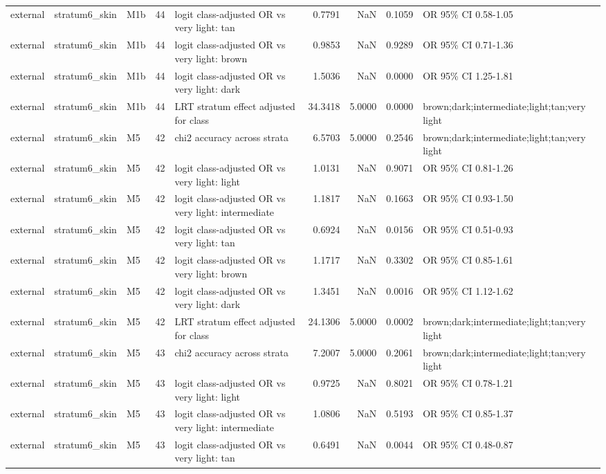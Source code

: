\begin{tabular}{lllrlrrrl}
external & stratum6\_skin & M1b & 44 & logit class-adjusted OR vs very light: tan & 0.7791 & NaN & 0.1059 & OR 95\% CI 0.58-1.05 \\
external & stratum6\_skin & M1b & 44 & logit class-adjusted OR vs very light: brown & 0.9853 & NaN & 0.9289 & OR 95\% CI 0.71-1.36 \\
external & stratum6\_skin & M1b & 44 & logit class-adjusted OR vs very light: dark & 1.5036 & NaN & 0.0000 & OR 95\% CI 1.25-1.81 \\
external & stratum6\_skin & M1b & 44 & LRT stratum effect adjusted for class & 34.3418 & 5.0000 & 0.0000 & brown;dark;intermediate;light;tan;very light \\
external & stratum6\_skin & M5 & 42 & chi2 accuracy across strata & 6.5703 & 5.0000 & 0.2546 & brown;dark;intermediate;light;tan;very light \\
external & stratum6\_skin & M5 & 42 & logit class-adjusted OR vs very light: light & 1.0131 & NaN & 0.9071 & OR 95\% CI 0.81-1.26 \\
external & stratum6\_skin & M5 & 42 & logit class-adjusted OR vs very light: intermediate & 1.1817 & NaN & 0.1663 & OR 95\% CI 0.93-1.50 \\
external & stratum6\_skin & M5 & 42 & logit class-adjusted OR vs very light: tan & 0.6924 & NaN & 0.0156 & OR 95\% CI 0.51-0.93 \\
external & stratum6\_skin & M5 & 42 & logit class-adjusted OR vs very light: brown & 1.1717 & NaN & 0.3302 & OR 95\% CI 0.85-1.61 \\
external & stratum6\_skin & M5 & 42 & logit class-adjusted OR vs very light: dark & 1.3451 & NaN & 0.0016 & OR 95\% CI 1.12-1.62 \\
external & stratum6\_skin & M5 & 42 & LRT stratum effect adjusted for class & 24.1306 & 5.0000 & 0.0002 & brown;dark;intermediate;light;tan;very light \\
external & stratum6\_skin & M5 & 43 & chi2 accuracy across strata & 7.2007 & 5.0000 & 0.2061 & brown;dark;intermediate;light;tan;very light \\
external & stratum6\_skin & M5 & 43 & logit class-adjusted OR vs very light: light & 0.9725 & NaN & 0.8021 & OR 95\% CI 0.78-1.21 \\
external & stratum6\_skin & M5 & 43 & logit class-adjusted OR vs very light: intermediate & 1.0806 & NaN & 0.5193 & OR 95\% CI 0.85-1.37 \\
external & stratum6\_skin & M5 & 43 & logit class-adjusted OR vs very light: tan & 0.6491 & NaN & 0.0044 & OR 95\% CI 0.48-0.87 \\

\end{tabular}
